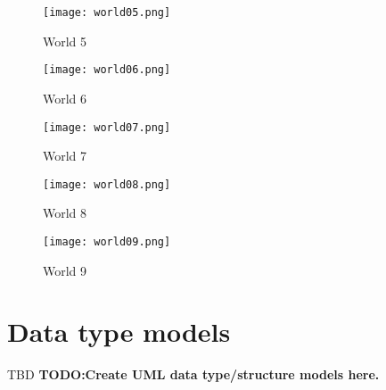 \begin{figure}[H]
	\centering
	\texttt{[image: world05.png]}
	\caption{World 5}
	\label{fig:world5}
\end{figure}

\begin{figure}[H]
	\centering
	\texttt{[image: world06.png]}
	\caption{World 6}
	\label{fig:world6}
\end{figure}

\begin{figure}[H]
	\centering
	\texttt{[image: world07.png]}
	\caption{World 7}
	\label{fig:world7}
\end{figure}

\begin{figure}[H]
	\centering
	\texttt{[image: world08.png]}
	\caption{World 8}
	\label{fig:world8}
\end{figure}

\begin{figure}[H]
	\centering
	\texttt{[image: world09.png]}
	\caption{World 9}
	\label{fig:world9}
\end{figure}

\section{Data type models}
TBD
\textbf{TODO:Create UML data type/structure models here.}
